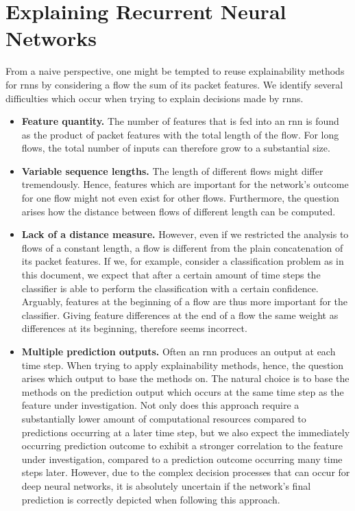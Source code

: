 \documentclass[conference]{IEEEtran}
\begin{document}
\section{Explaining Recurrent Neural Networks}
From a naive perspective, one might be tempted to reuse explainability methods for \glspl{rnn} by considering a flow the sum of its packet features.
We identify several difficulties which occur when trying to explain decisions made by \glspl{rnn}. 

\begin{itemize}[topsep=0pt,wide,labelwidth=!,labelindent=0pt]
\item
\textbf{Feature quantity.}
The number of features that is fed into an \gls{rnn} is found as the product of packet features with the total length of the flow. For long flows, the total number of inputs can therefore grow to a substantial size.

\item
\textbf{Variable sequence lengths.}
The length of different flows might differ tremendously. Hence, features which are important for the network's outcome for one flow might not even exist for other flows. Furthermore, the question arises how the distance between flows of different length can be computed.

\item
\textbf{Lack of a distance measure.}
However, even if we restricted the analysis to flows of a constant length, a flow is different from the plain concatenation of its packet features.
If we, for example, consider a classification problem as in this document, we expect that after a certain amount of time steps the classifier is able to perform the classification with a certain confidence. Arguably, features at the beginning of a flow are thus more important for the classifier. Giving feature differences at the end of a flow the same weight as differences at its beginning, therefore seems incorrect.

\item
\textbf{Multiple prediction outputs.}
Often an \gls{rnn} produces an output at each time step. When trying to apply explainability methods, hence, the question arises which output to base the methods on. The natural choice is to base the methods on the prediction output which occurs at the same time step as the feature under investigation. Not only does this approach require a substantially lower amount of computational resources compared to predictions occurring at a later time step, but we also expect the immediately occurring prediction outcome to exhibit a stronger correlation to the feature under investigation, compared to a prediction outcome occurring many time steps later.
However, due to the complex decision processes that can occur for deep neural networks, it is absolutely  uncertain if the network's final prediction is correctly depicted when following this approach.
\end{itemize}
\end{document}
